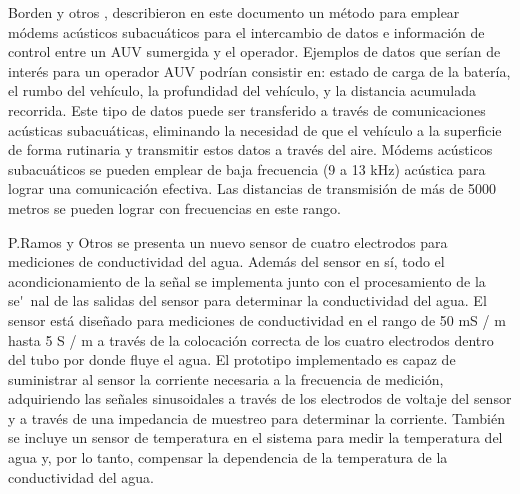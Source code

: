 Borden  y otros \cite{borden2012long},  describieron en este documento un m\'etodo para emplear m\'odems ac\'usticos subacu\'aticos para el intercambio de datos e informaci\'on  de control entre un AUV sumergida y el operador. Ejemplos de datos que ser\'ian de  inter\'es para un operador AUV podr\'ian consistir en: estado de carga de la bater\'ia, el rumbo del veh\'iculo, la profundidad del veh\'iculo, y la distancia acumulada recorrida. Este  tipo de datos puede ser transferido a través de comunicaciones acústicas subacu\'aticas, eliminando la  necesidad de que el veh\'iculo a la superficie de forma rutinaria y transmitir estos datos a trav\'es del aire. M\'odems ac\'usticos subacuáticos se pueden emplear de baja frecuencia (9 a 13 kHz) ac\'ustica para lograr  una comunicación efectiva. Las distancias de transmisi\'on de m\'as de 5000 metros se  pueden lograr con frecuencias en este rango.

 P.Ramos y Otros \cite{ramos2008four} se presenta un nuevo sensor de cuatro electrodos para mediciones de conductividad del agua. Adem\'as del sensor en s\'i, todo el acondicionamiento de la se\~nal se implementa junto con el procesamiento de la se\'~nal de las salidas del sensor para determinar la conductividad del agua. El sensor est\'a dise\~nado para mediciones de conductividad en el rango de 50 mS / m hasta 5 S / m a trav\'es de la colocaci\'on correcta de los cuatro electrodos dentro del tubo por donde fluye el agua. El prototipo implementado es capaz de suministrar al sensor la corriente necesaria a la frecuencia de medici\'on, adquiriendo las señales sinusoidales a trav\'es de los electrodos de voltaje del sensor y a trav\'es de una impedancia de muestreo para determinar la corriente. Tambi\'en se incluye un sensor de temperatura en el sistema para medir la temperatura del agua y, por lo tanto, compensar la dependencia de la temperatura de la conductividad del agua.
 